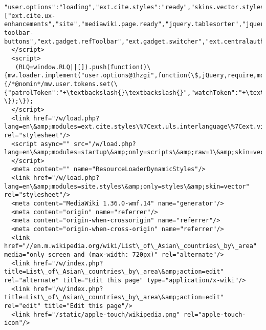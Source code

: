 \documentclass[11pt]{article}
\begin{document}
\begin{Verbatim}[commandchars=\\\{\}]
"user.options":"loading","ext.cite.styles":"ready","skins.vector.styles.legacy":"ready","jquery.tablesorter.styles":"ready","jquery.makeCollapsible.styles":"ready","ext.visualEditor.desktopArticleTarget.noscript":"ready","ext.uls.interlanguage":"ready","ext.wikimediaBadges":"ready","wikibase.client.init":"ready"\};RLPAGEMODULES=["ext.cite.ux-enhancements","site","mediawiki.page.ready","jquery.tablesorter","jquery.makeCollapsible","skins.vector.legacy.js","ext.gadget.ReferenceTooltips","ext.gadget.charinsert","ext.gadget.extra-toolbar-buttons","ext.gadget.refToolbar","ext.gadget.switcher","ext.centralauth.centralautologin","mmv.head","mmv.bootstrap.autostart","ext.popups","ext.visualEditor.desktopArticleTarget.init","ext.visualEditor.targetLoader","ext.eventLogging","ext.wikimediaEvents","ext.navigationTiming","ext.uls.compactlinks","ext.uls.interface","ext.cx.eventlogging.campaigns","ext.quicksurveys.init","ext.centralNotice.geoIP","ext.centralNotice.startUp"];
  </script>
  <script>
   (RLQ=window.RLQ||[]).push(function()\{mw.loader.implement("user.options@1hzgi",function(\$,jQuery,require,module)\{/*@nomin*/mw.user.tokens.set(\{"patrolToken":"+\textbackslash{}\textbackslash{}","watchToken":"+\textbackslash{}\textbackslash{}","csrfToken":"+\textbackslash{}\textbackslash{}"\});
\});\});
  </script>
  <link href="/w/load.php?lang=en\&amp;modules=ext.cite.styles\%7Cext.uls.interlanguage\%7Cext.visualEditor.desktopArticleTarget.noscript\%7Cext.wikimediaBadges\%7Cjquery.makeCollapsible.styles\%7Cjquery.tablesorter.styles\%7Cskins.vector.styles.legacy\%7Cwikibase.client.init\&amp;only=styles\&amp;skin=vector" rel="stylesheet"/>
  <script async="" src="/w/load.php?lang=en\&amp;modules=startup\&amp;only=scripts\&amp;raw=1\&amp;skin=vector">
  </script>
  <meta content="" name="ResourceLoaderDynamicStyles"/>
  <link href="/w/load.php?lang=en\&amp;modules=site.styles\&amp;only=styles\&amp;skin=vector" rel="stylesheet"/>
  <meta content="MediaWiki 1.36.0-wmf.14" name="generator"/>
  <meta content="origin" name="referrer"/>
  <meta content="origin-when-crossorigin" name="referrer"/>
  <meta content="origin-when-cross-origin" name="referrer"/>
  <link href="//en.m.wikipedia.org/wiki/List\_of\_Asian\_countries\_by\_area" media="only screen and (max-width: 720px)" rel="alternate"/>
  <link href="/w/index.php?title=List\_of\_Asian\_countries\_by\_area\&amp;action=edit" rel="alternate" title="Edit this page" type="application/x-wiki"/>
  <link href="/w/index.php?title=List\_of\_Asian\_countries\_by\_area\&amp;action=edit" rel="edit" title="Edit this page"/>
  <link href="/static/apple-touch/wikipedia.png" rel="apple-touch-icon"/>

\end{Verbatim}
\end{document}
